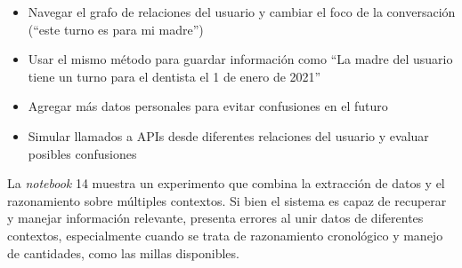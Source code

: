 \begin{itemize}
\item Navegar el grafo de relaciones del usuario y cambiar el foco de la conversación (``este turno es para mi madre'')
\item Usar el mismo método para guardar información como ``La madre del usuario tiene un turno para el dentista el 1 de enero de 2021''
\item Agregar más datos personales para evitar confusiones en el futuro
\item Simular llamados a APIs desde diferentes relaciones del usuario y evaluar posibles confusiones
\end{itemize}

La \textit{notebook} 14 muestra un experimento que combina la extracción de datos y el razonamiento sobre múltiples contextos. Si bien el sistema es capaz de recuperar y manejar información relevante, presenta errores al unir datos de diferentes contextos, especialmente cuando se trata de razonamiento cronológico y manejo de cantidades, como las millas disponibles. 